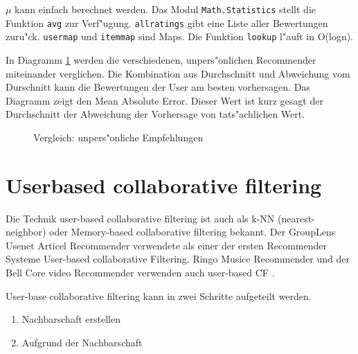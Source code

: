 \documentclass[a4paper, 12pt]{article}
\begin{document}
$\mu$ kann einfach berechnet werden. Das Modul \verb|Math.Statistics| stellt die Funktion \verb|avg| zur Verf"ugung. \verb|allratings| gibt eine Liste aller Bewertungen zuru"ck. \verb|usermap| und \verb|itemmap| sind Maps. Die Funktion \verb|lookup| l"auft in O(logn).

In Diagramm \ref{fig:maebaselines} werden die verschiedenen, unpers"onlichen Recommender miteinander verglichen. Die Kombination aus Durchschnitt und Abweichung vom Durschnitt kann die Bewertungen der User am besten vorhersagen. Das Diagramm zeigt den Mean Absolute Error. Dieser Wert ist kurz gesagt der Durchschnitt der Abweichung der Vorhersage von tats"achlichen Wert.

\begin{figure}
  \centering
{}
  
  \caption{Vergleich: unpers"onliche Empfehlungen}
  \label{fig:maebaselines}
\end{figure}


\section{Userbased collaborative filtering}

Die Technik user-based collaborative filtering ist auch als k-NN (nearest-neighbor) oder Memory-based collaborative filtering bekannt. Der GroupLens Usenet Articel Recommender verwendete als einer der ersten Recommender Systeme User-based collaborative Filtering. Ringo Musice Recommender und der Bell Core video Recommender verwenden auch user-based CF .

User-base collaborative filtering kann in zwei Schritte aufgeteilt werden. 

\begin{enumerate}
\item Nachbarschaft erstellen
\item Aufgrund der Nachbarschaft 
\end{enumerate}
\end{document}
